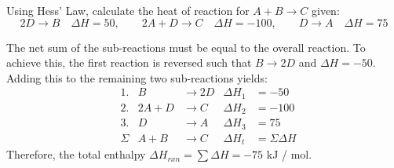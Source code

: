 \documentclass[answers]{exam}
\begin{document}
\begin{questions}
\bigskip
\question Using Hess' Law, calculate the heat of reaction for $A + B \to C$ given: \begin{equation}
  2D \to B \quad \Delta H = 50 ,\qquad 2A + D \to C \quad \Delta H = -100 ,\qquad D \to A \quad \Delta H = 75
\end{equation}
%
\begin{solutionbox}{2in}
  The net sum of the sub-reactions must be equal to the overall reaction. To achieve this, the first reaction is reversed such that $B \to 2D$ and $\Delta H = -50$. Adding this to the remaining two sub-reactions yields:
    \begin{align*}
      & 1. & B &\to 2D & \Delta H_1 &= -50 \\
      & 2. & 2A + D &\to C & \Delta H_2 &= -100 \\
      & 3. & D &\to A & \Delta H_3 &= 75 \\
      & \Sigma & A + B &\to C & \Delta H_t &= \Sigma \Delta H
    \end{align*}
    Therefore, the total enthalpy $\Delta H_{rxn} = \sum \Delta H = -75$ kJ / mol.
\end{solutionbox}

\end{questions}
\end{document}
